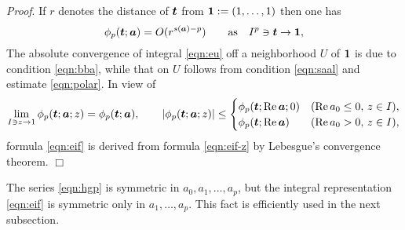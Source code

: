 \documentclass[a4paper,12pt]{article}
\theoremstyle{plain}
\def\rRe{\mathrm{Re}}
\def\ba{\mbox{\boldmath $a$}}
\def\sba{\mbox{\boldmath ${\scriptstyle a}$}}
\def\bt{\mbox{\boldmath $t$}}
\def\1{\mbox{\boldmath $1$}}
\begin{document}
{\it Proof}. 
If $r$ denotes the distance of $\bt$ from $\1 := (1, \dots,1)$ then one has  
\begin{equation} \label{eqn:polar}
\phi_p(\bt; \ba) = O(r^{s(\sba)-p}) \qquad \mbox{as} \quad I^p \ni \bt \to \1,   
\end{equation}
The absolute convergence of integral \eqref{eqn:eu} off a neighborhood 
$U$ of $\1$ is due to condition \eqref{eqn:bba}, while that on $U$  
follows from condition \eqref{eqn:saal} and estimate \eqref{eqn:polar}. 
In view of 
\[
\lim_{I \ni z \to 1} \phi_p( \bt ; \ba ; z)  = \phi_p( \bt; \ba ),   
\qquad 
|\phi_p( \bt ; \ba ; z)| \le 
\begin{cases}
\phi_p( \bt; \rRe \, \ba; 0) & (\rRe \, a_0 \le 0, \, z \in I), \\ 
\phi_p( \bt; \rRe \, \ba)    & (\rRe \, a_0 > 0, \, z \in I), 
\end{cases}
\]
formula \eqref{eqn:eif} is derived from formula \eqref{eqn:eif-z} by 
Lebesgue's convergence theorem.  \hfill $\Box$ \par\medskip
The series \eqref{eqn:hgp} is symmetric in $a_0, a_1, \dots, a_p$, 
but the integral representation \eqref{eqn:eif} is symmetric only in 
$a_1, \dots, a_p$.          
This fact is efficiently used in the next subsection.    
\end{document}
